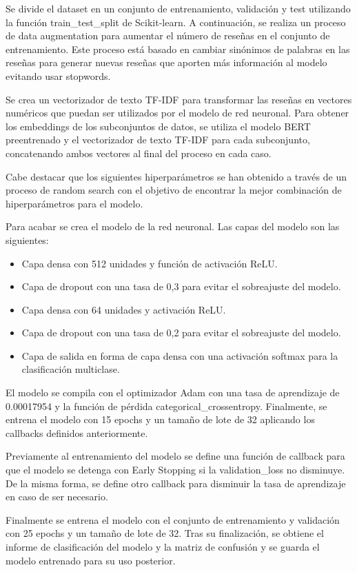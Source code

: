 Se divide el dataset en un conjunto de entrenamiento, validación y test utilizando la función train\_test\_split de Scikit-learn.
A continuación, se realiza un proceso de data augmentation para aumentar el número de reseñas en el conjunto de entrenamiento.
Este proceso está basado en cambiar sinónimos de palabras en las reseñas para generar nuevas reseñas que aporten más información al modelo evitando usar stopwords.

Se crea un vectorizador de texto TF-IDF para transformar las reseñas en vectores numéricos que puedan ser utilizados por el modelo de red neuronal.
Para obtener los embeddings de los subconjuntos de datos, se utiliza el modelo BERT preentrenado y el vectorizador de texto TF-IDF para cada subconjunto, concatenando ambos vectores al final del proceso en cada caso.

Cabe destacar que los siguientes hiperparámetros se han obtenido a través de un proceso de random search con el objetivo de encontrar la mejor combinación de hiperparámetros para el modelo.

Para acabar se crea el modelo de la red neuronal. Las capas del modelo son las siguientes:
\begin{itemize}
    \item Capa densa con 512 unidades y función de activación ReLU.
    \item Capa de dropout con una tasa de 0,3 para evitar el sobreajuste del modelo.
    \item Capa densa con 64 unidades y activación ReLU.
    \item Capa de dropout con una tasa de 0,2 para evitar el sobreajuste del modelo.
    \item Capa de salida en forma de capa densa con una activación softmax para la clasificación multiclase.
\end{itemize}

El modelo se compila con el optimizador Adam con una tasa de aprendizaje de 0.00017954 y la función de pérdida categorical\_crossentropy.
Finalmente, se entrena el modelo con 15 epochs y un tamaño de lote de 32 aplicando los callbacks definidos anteriormente.

Previamente al entrenamiento del modelo se define una función de callback para que el modelo se detenga con Early Stopping si la validation\_loss no disminuye. 
De la misma forma, se define otro callback para disminuir la tasa de aprendizaje en caso de ser necesario.

Finalmente se entrena el modelo con el conjunto de entrenamiento y validación con 25 epochs y un tamaño de lote de 32.
Tras su finalización, se obtiene el informe de clasificación del modelo y la matriz de confusión y se guarda el modelo entrenado para su uso posterior.

